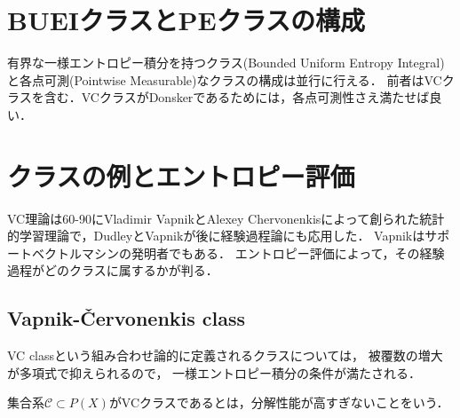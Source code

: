 \documentclass[uplatex,dvipdfmx]{jsreport}
\renewcommand{\C}{\mathcal{C}}
\begin{document}
\section{BUEIクラスとPEクラスの構成}

\begin{tcolorbox}[colframe=ForestGreen, colback=ForestGreen!10!white,breakable,colbacktitle=ForestGreen!40!white,coltitle=black,fonttitle=\bfseries\sffamily,
title=]
    有界な一様エントロピー積分を持つクラス(Bounded Uniform Entropy Integral)と各点可測(Pointwise Measurable)なクラスの構成は並行に行える．
    前者はVCクラスを含む．VCクラスがDonskerであるためには，各点可測性さえ満たせば良い．
\end{tcolorbox}

\section{クラスの例とエントロピー評価}

\begin{tcolorbox}[colframe=ForestGreen, colback=ForestGreen!10!white,breakable,colbacktitle=ForestGreen!40!white,coltitle=black,fonttitle=\bfseries\sffamily,
title=]
    VC理論は60-90にVladimir VapnikとAlexey Chervonenkisによって創られた統計的学習理論で，DudleyとVapnikが後に経験過程論にも応用した．
    Vapnikはサポートベクトルマシンの発明者でもある．
    エントロピー評価によって，その経験過程がどのクラスに属するかが判る．
\end{tcolorbox}

\subsection{Vapnik-\v{C}ervonenkis class}

\begin{tcolorbox}[colframe=ForestGreen, colback=ForestGreen!10!white,breakable,colbacktitle=ForestGreen!40!white,coltitle=black,fonttitle=\bfseries\sffamily,
title=]
    VC classという組み合わせ論的に定義されるクラスについては，
    被覆数の増大が多項式で抑えられるので，
    一様エントロピー積分の条件が満たされる．
    
    集合系$\C\subset P(X)$がVCクラスであるとは，分解性能が高すぎないことをいう．
\end{tcolorbox}
\end{document}
